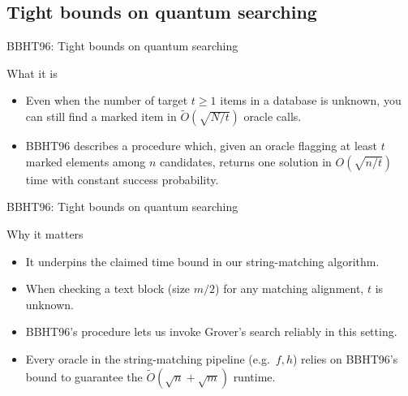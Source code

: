 \documentclass{beamer}
\begin{document}
\subsection{Tight bounds on quantum searching}
\begin{frame}{BBHT96: Tight bounds on quantum searching}
    \begin{block}{What it is}
        \begin{itemize}
            \item Even when the number of target \(t \ge 1\) items in a database is unknown,
                  you can still find a marked item in \(\tilde O(\sqrt{N/t})\) oracle calls.
            \item BBHT96 describes a procedure which, given an oracle flagging at least \(t\) marked
                  elements among \(n\) candidates, returns one solution in \(O(\sqrt{n/t})\) time
                  with constant success probability.
        \end{itemize}
    \end{block}
\end{frame}


\begin{frame}{BBHT96: Tight bounds on quantum searching}

    \begin{block}{Why it matters}
        \begin{itemize}
            \item It underpins the claimed time bound in our string-matching algorithm.
            \item When checking a text block (size \(m/2\)) for any matching alignment, \(t\) is unknown.
            \item BBHT96's procedure lets us invoke Grover's search reliably in this setting.
            \item Every oracle in the string-matching pipeline (e.g.\ \(f, h\)) relies on BBHT96's bound
                  to guarantee the \(\tilde O(\sqrt n + \sqrt m)\) runtime.
        \end{itemize}
    \end{block}
\end{frame}
\end{document}
